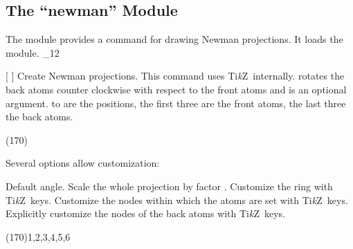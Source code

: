\documentclass[load-preamble+]{cnltx-doc}
\makeatletter
\newcommand*\TikZ{Ti\textit{k}Z}
\def\chemmodule*#1{\textquotedblleft#1\textquotedblright}%
\renewenvironment{commands}
  {%
    \cnltx@set@catcode_{12}%
    \let\command\cnltx@command
    \cnltxlist
  }
  {\endcnltxlist}
\makeatother
\begin{document}
\subsection{The \chemmodule*{newman} Module}\label{sec:newman-module}
The  module provides a command for drawing Newman
projections.  It loads the  module.
\begin{commands}
  \command{newman}[%
    ]
    Create Newman projections.  This command uses \TikZ\ internally.
     rotates the back atoms counter clockwise with respect to the
    front atoms and is an optional argument.   to  are the
    positions, the first three are the front atoms, the last three the back
    atoms.
\end{commands}

\begin{example}
  \newman{} \newman(170){}
    
\end{example}

Several options allow customization:
\begin{options}
    Default angle.
    Scale the whole projection by factor .
  \Default
    Customize the ring with \TikZ\ keys.
  \Default
    Customize the nodes within which the atoms are set with \TikZ\ keys.
  \Default
    Explicitly customize the nodes of the back atoms with \TikZ\ keys.
\end{options}

\begin{example}
   \newman{}
  \newman[scale=.75,ring={draw=blue,fill=blue!20}]{}
\end{example}

\begin{example}
\end{example}

\begin{example}
   \newman(170){1,2,3,4,5,6}
\end{example}
\end{document}

